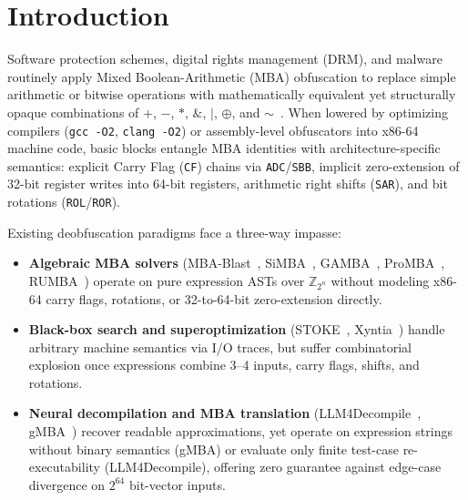 \documentclass[11pt,a4paper]{article}
\begin{document}
\begin{abstract}
(3)~\textbf{Benchmark 3 ($V_{\mathrm{real}}$, $N=22$ \texttt{-O2 -fno-inline} binaries across 4 C templates: 10 \texttt{affine\_mul\_64}, 10 \texttt{hash\_mix\_64}, 1 \texttt{4var\_token\_64}, 1 \texttt{signed\_shift\_32}):} non-LLM baselines $A$ and $C$ solve \textbf{0/22 (0.0\%)}, whereas \textbf{Hybrid $H$ + Lean 4 \texttt{bv\_decide}} certifies \textbf{22/22 (100.0\%; $\max 31.64$\,s; 95\% CI $[84.6\%, 100\%]$; $p = 4.77 \times 10^{-7}$)} in 23.44\,s mean time (\texttt{H-sol}: 6/22 = 27.27\%, $p = 0.031$, not significant at $\alpha = 0.01$).
Mutation testing and pre-filter-evading negatives yielded 0 false positives, and all 362 Phase~1 \texttt{PASS} entries record verified \texttt{lrat\_sha256} digests.
\end{abstract}

\section{Introduction}

Software protection schemes, digital rights management (DRM), and malware routinely apply Mixed Boolean-Arithmetic (MBA) obfuscation to replace simple arithmetic or bitwise operations with mathematically equivalent yet structurally opaque combinations of $+$, $-$, $*$, $\&$, $|$, $\oplus$, and $\sim$~\cite{mbablast2021,simba2022}. When lowered by optimizing compilers (\texttt{gcc -O2}, \texttt{clang -O2}) or assembly-level obfuscators into x86-64 machine code, basic blocks entangle MBA identities with architecture-specific semantics: explicit Carry Flag (\texttt{CF}) chains via \texttt{ADC}/\texttt{SBB}, implicit zero-extension of 32-bit register writes into 64-bit registers, arithmetic right shifts (\texttt{SAR}), and bit rotations (\texttt{ROL}/\texttt{ROR}).

Existing deobfuscation paradigms face a three-way impasse:
\begin{itemize}[leftmargin=1.5em]
  \item \textbf{Algebraic MBA solvers} (MBA-Blast~\cite{mbablast2021}, SiMBA~\cite{simba2022}, GAMBA~\cite{gamba2023}, ProMBA~\cite{promba2023,promba2026tosem}, RUMBA~\cite{rumba2026}) operate on pure expression ASTs over $\mathbb{Z}_{2^n}$ without modeling x86-64 carry flags, rotations, or 32-to-64-bit zero-extension directly.
  \item \textbf{Black-box search and superoptimization} (STOKE~\cite{stoke2013}, Xyntia~\cite{xyntia2021}) handle arbitrary machine semantics via I/O traces, but suffer combinatorial explosion once expressions combine 3--4 inputs, carry flags, shifts, and rotations.
  \item \textbf{Neural decompilation and MBA translation} (LLM4Decompile~\cite{llm4decompile2024}, gMBA~\cite{gmba2025}) recover readable approximations, yet operate on expression strings without binary semantics (gMBA) or evaluate only finite test-case re-executability (LLM4Decompile), offering zero guarantee against edge-case divergence on $2^{64}$ bit-vector inputs.
\end{itemize}
\end{document}
